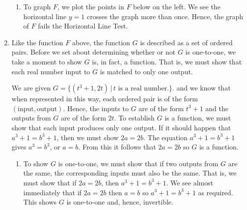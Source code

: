 \documentclass{ximera}
\begin{document}
\begin{example}
\begin{enumerate}
\begin{enumerate}
\item  To graph $F$, we plot the points in $F$ below on the left.  We see the horizontal line $y=1$ crosses the graph more than once.  Hence, the graph of $F$ fails the Horizontal Line Test.

\begin{center}


% 


\end{center}

\end{enumerate}

\item  Like the function $F$ above, the function $G$ is described as a set of ordered pairs.  Before we set about determining whether or not $G$ is one-to-one, we take a moment to show $G$ is, in fact, a function. That is, we must show that each real number input to $G$ is matched to only one output.  

\smallskip

We are given  $G = \{ (t^3+1, 2t) \, | \, \text{$t$ is a real number.} \}$. and we know that when represented in this way, each ordered pair is of the form $(\text{input}, \text{output})$.  Hence, the inputs to $G$ are of the form $t^3+1$ and the outputs from $G$ are of the form $2t$.  To establish $G$ is a function, we must show that each input produces only one output.  If it should happen that $a^3+1 = b^3+1$, then we must show $2a = 2b$.  The equation $a^3+1 = b^3+1$ gives $a^3=b^3$, or  $a=b$. From this it follows that $2a=2b$ so $G$ is a function.

\begin{enumerate}

\item To show $G$ is one-to-one, we must show that if two outputs from $G$ are the same, the corresponding inputs must also be the same.  That is, we must show that if $2a=2b$, then $a^3+1 = b^3+1$.  We see almost immediately that if $2a=2b$ then $a=b$ so $a^3+1 = b^3+1$ as required.  This shows $G$ is one-to-one and, hence,  invertible.



\end{enumerate}
\end{enumerate}
\end{example}
\end{document}
